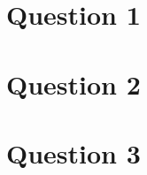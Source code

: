 \documentclass[parskip=full]{scrartcl}
\newcommand\pspara{\fontsize{13pt}{18pt}\selectfont}
\begin{document}

\begin{multicols}{2}
\pspara
\section*{Question 1}
    \subsection*{}
    

\section*{Question 2}
\section*{Question 3}

\end{multicols}
\end{document}
